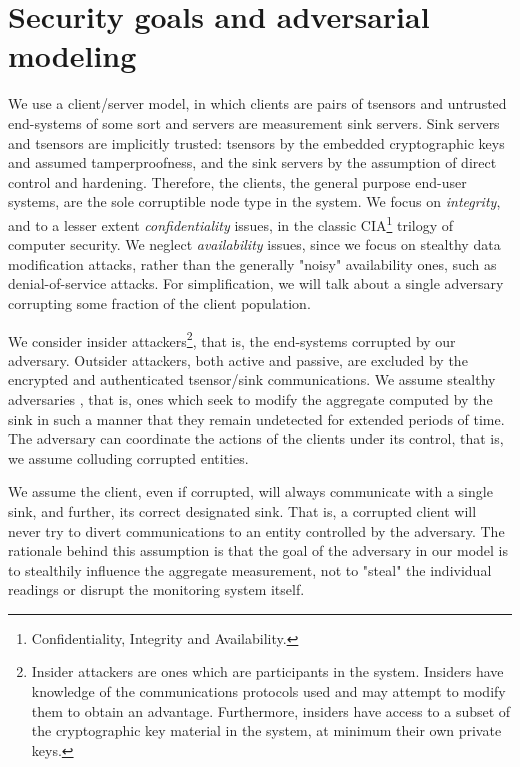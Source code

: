 \section*{Security goals and adversarial modeling}
\label{sec:sec-goals}

We use a client/server model, in which clients are pairs of tsensors and untrusted end-systems of some sort and servers are measurement sink servers. Sink servers and tsensors are implicitly trusted: tsensors by the embedded cryptographic keys and assumed tamperproofness, and the sink servers by the assumption of direct control and hardening. Therefore, the clients, the general purpose end-user systems, are the sole corruptible node type in the system.
%
We focus on \textit{integrity}, and to a lesser extent \textit{confidentiality} issues, in the classic CIA\footnote{Confidentiality, Integrity and Availability.} trilogy of computer security. We neglect \textit{availability} issues, since we focus on stealthy data modification attacks, rather than the generally "noisy" availability ones, such as denial-of-service attacks. For simplification, we will talk about a single adversary corrupting some fraction of the client population.

We consider insider attackers\footnote{Insider attackers are ones which are participants in the system. Insiders have knowledge of the communications protocols used and may attempt to modify them to obtain an advantage. Furthermore, insiders have access to a subset of the cryptographic key material in the system, at minimum their own private keys.}, that is, the end-systems corrupted by our adversary. Outsider attackers, both active and passive, are excluded by the encrypted and authenticated tsensor/sink communications. We assume stealthy adversaries , that is, ones which seek to modify the aggregate computed by the sink in such a manner that they remain undetected for extended periods of time. The adversary can coordinate the actions of the clients under its control, that is, we assume colluding corrupted entities.

We assume the client, even if corrupted, will always communicate with a single sink, and further, its correct designated sink. That is, a corrupted client will never try to divert communications to an entity controlled by the adversary. The rationale behind this assumption is that the goal of the adversary in our model is to stealthily influence the aggregate measurement, not to "steal" the individual readings or disrupt the monitoring system itself.

